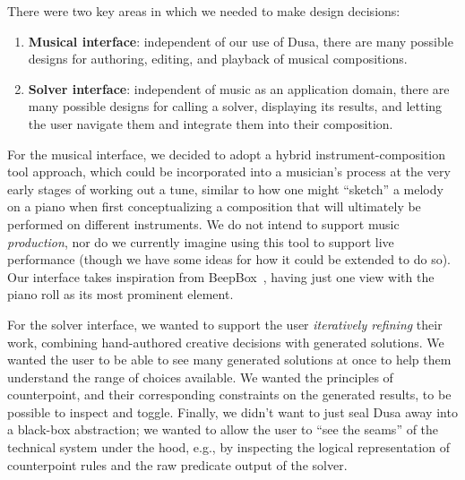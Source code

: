 There were two key areas in which we needed to make design decisions:
\begin{enumerate}
    \item {\bf Musical interface}: independent of our use
          of Dusa, there are many possible designs for
          authoring, editing, and playback of musical compositions.
    \item {\bf Solver interface}: independent of music as an
          application domain, there are many possible designs
          for calling a solver, displaying its results, and
          letting the user navigate them and integrate them
          into their composition.
\end{enumerate}

For the musical interface, we decided to adopt a
hybrid instrument-composition
tool approach, which could be incorporated into a musician's process at the
very early stages of working out a tune, similar to how
one might ``sketch'' a melody on a piano when first conceptualizing
a composition that will ultimately be performed on different instruments.
We do not intend to support music
    {\em production}, nor do we currently imagine using this
tool to support live performance (though we have some ideas
for how it could be extended to do so).
Our interface takes inspiration from
BeepBox~\cite{beepbox}, having just one view with
the piano roll as its most prominent element.


For the solver interface, we wanted to support
the user {\em iteratively refining} their work,
combining hand-authored creative decisions with
generated solutions.
We wanted the user to be able to see many
generated solutions at once to help them understand
the range of choices available.
We wanted the principles of counterpoint, and their
corresponding constraints on the generated results,
to be possible to inspect and toggle.
Finally, we didn't want to just seal Dusa away
into a black-box abstraction; we wanted to allow
the user to ``see the seams'' of the technical
system under the hood, e.g., by inspecting
the logical representation of counterpoint rules
and the raw predicate output of the solver.

